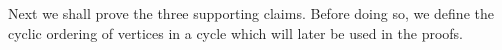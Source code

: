






Next we shall prove the three supporting claims. Before doing so,  we define the cyclic ordering of vertices in a cycle which will later be used in the proofs.


